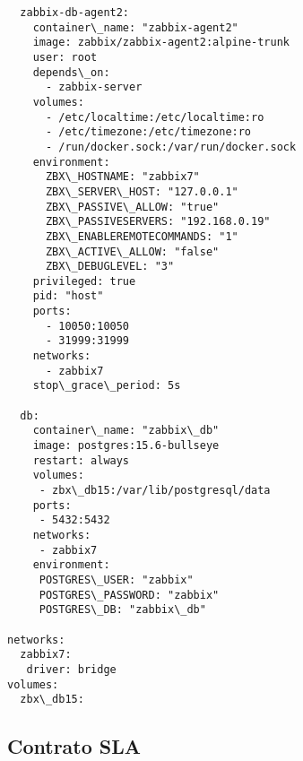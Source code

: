\begin{lstlisting}
  zabbix-db-agent2:
    container\_name: "zabbix-agent2"
    image: zabbix/zabbix-agent2:alpine-trunk
    user: root
    depends\_on:
      - zabbix-server
    volumes:
      - /etc/localtime:/etc/localtime:ro
      - /etc/timezone:/etc/timezone:ro
      - /run/docker.sock:/var/run/docker.sock
    environment:
      ZBX\_HOSTNAME: "zabbix7"
      ZBX\_SERVER\_HOST: "127.0.0.1"
      ZBX\_PASSIVE\_ALLOW: "true"
      ZBX\_PASSIVESERVERS: "192.168.0.19"
      ZBX\_ENABLEREMOTECOMMANDS: "1"
      ZBX\_ACTIVE\_ALLOW: "false"
      ZBX\_DEBUGLEVEL: "3"
    privileged: true
    pid: "host"
    ports:
      - 10050:10050
      - 31999:31999 
    networks:
      - zabbix7
    stop\_grace\_period: 5s
   
  db:
    container\_name: "zabbix\_db"
    image: postgres:15.6-bullseye
    restart: always
    volumes:
     - zbx\_db15:/var/lib/postgresql/data
    ports:
     - 5432:5432
    networks:
     - zabbix7
    environment:
     POSTGRES\_USER: "zabbix"
     POSTGRES\_PASSWORD: "zabbix"
     POSTGRES\_DB: "zabbix\_db"

networks:
  zabbix7:
   driver: bridge
volumes:
  zbx\_db15:
\end{lstlisting}

\subsection{Contrato SLA}\label{sec:contract}


